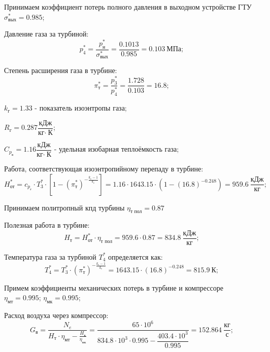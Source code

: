 Принимаем коэффициент потерь полного давления в выходном устройстве ГТУ $\sigma^*_{\text{вых}}=0.985$;

Давление газа за турбиной:
\begin{equation} \label{eu_eqn}
	p_{4}^*=\dfrac{p^*_{\text{н}}}{\sigma^*_{\text{вых}}}=\dfrac{0.1013}{0.985}=0.103 \  \text{МПа};
\end{equation}

Степень расширения газа в турбине:
\begin{equation} \label{eu_eqn}
	\pi_{\text{т}}^*=\dfrac{p_{3}^*}{p_{4}^*}=\dfrac{1.728}{0.103}=16.8;
\end{equation}

$k_{\text{г}}=1.33$ - показатель изоэнтропы газа;

$R_{\text{г}}=0.287 \dfrac{\text{кДж}}{\text{кг}\cdot \ \text{К}}$;

$C_{p_{\text{в}}}=1.16 \dfrac{\text{кДж}}{\text{кг}\cdot \ \text{К}}$ - удельная изобарная теплоёмкость газа;

Работа, соответствующая изоэнтропийному перепаду в турбине:
\begin{equation} \label{eu_eqn}
	H_{\text{от}}^*=c_{p_{\text{г}}}\cdot T_{3}^*\cdot[1-(\pi_{\text{т}}^*)^{-\frac{k_{\text{г}}-1}{k_{\text{г}}}}]=1.16\cdot 1643.15\cdot (1-(16.8)^{-0.248})=959.6 \  \dfrac{\text{кДж}}{\text{кг}};
\end{equation}

Принимаем политропный кпд турбины $\eta_{\text{т пол}}=0.87$

Полезная работа в турбине:
\begin{equation} \label{eu_eqn}
	H_{\text{т}}=H_{\text{от}}^* \cdot \eta_{\text{т пол}}=959.6\cdot 0.87=834.8 \  \dfrac{\text{кДж}}{\text{кг}};
\end{equation}

Температура газа за турбиной $T_{4}^*$ определяется как:
\begin{equation} \label{eu_eqn}
	T_{4}^*=T_{3}^* \cdot (\pi_{\text{т}}^*)^{-\frac{k_{\text{г}}-1}{k_{\text{г}}}}=1643.15\cdot (16.8)^{-0.248}=815.9 \ \text{К};
\end{equation}

Примем коэффициенты механических потерь в турбине и компрессоре $\eta_{\text{мт}}=0.995$; $\eta_{\text{мк}}=0.995$;

Расход воздуха через компрессор:
\begin{equation} \label{eu_eqn}
	G_{\text{в}}=\dfrac{N_{e}}{H_{\text{т}}\cdot \eta_{\text{мт}}-\frac{H_{\text{к}}}{\eta_{\text{мк}}}}=\dfrac{65\cdot 10^6}{834.8\cdot 10^3\cdot 0.995-  \dfrac{403.4\cdot 10^3}{0.995}}= 152.864 \ \dfrac{\text{кг}}{\text{с}};
\end{equation}

